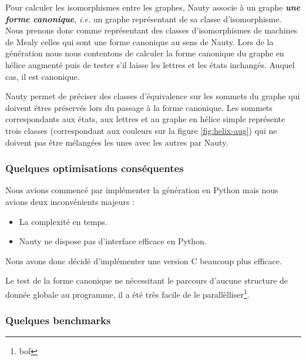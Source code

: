 \documentclass[11pt,a4paper]{article}
\begin{document}
Pour calculer les isomorphismes entre les graphes, \textrm{Nauty} associe à un graphe \textit{\textbf{une forme canonique}}, \emph{i.e.} un graphe représentant de sa classe d'isomorphisme. Nous prenons donc comme représentant des classes d'isomorphismes de machines de Mealy celles qui sont une forme canonique au sens de \textrm{Nauty}. Lors de la génération nous nous contentons de calculer la forme canonique du graphe en hélice augmenté puis de tester s'il laisse les lettres et les états inchangés. Auquel cas, il est canonique.

Nauty permet de préciser des classes d'équivalence sur les sommets du graphe qui doivent êtres préservés lors du passage à la forme canonique. Les sommets correspondants aux états, aux lettres et au graphe en hélice simple représente trois classes (correspondant aux couleurs sur la figure \ref{fig:helix-aug}) qui ne doivent pas être mélangées les unes avec les autres par \textrm{Nauty}.

\subsubsection*{Quelques optimisations conséquentes}
Nous avions commencé par implémenter la génération en \textrm{Python} mais nous avions deux inconvénients majeurs :
\begin{itemize}
\item La complexité en temps.
\item \textrm{Nauty} ne dispose pas d'interface efficace en Python.
\end{itemize}

Nous avons donc décidé d'implémenter une version C beaucoup plus efficace.

Le test de la forme canonique ne nécessitant le parcours d'aucune structure de donnée globale au programme, il a été très facile de le parallèlliser\footnote{bof}.

\subsubsection*{Quelques benchmarks}
\end{document}
